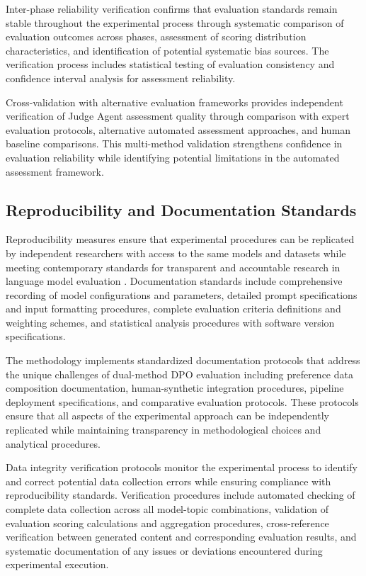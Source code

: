 Inter-phase reliability verification confirms that evaluation standards remain stable throughout the experimental process through systematic comparison of evaluation outcomes across phases, assessment of scoring distribution characteristics, and identification of potential systematic bias sources. The verification process includes statistical testing of evaluation consistency and confidence interval analysis for assessment reliability.

Cross-validation with alternative evaluation frameworks provides independent verification of Judge Agent assessment quality through comparison with expert evaluation protocols, alternative automated assessment approaches, and human baseline comparisons. This multi-method validation strengthens confidence in evaluation reliability while identifying potential limitations in the automated assessment framework.

\subsection{Reproducibility and Documentation Standards}

Reproducibility measures ensure that experimental procedures can be replicated by independent researchers with access to the same models and datasets while meeting contemporary standards for transparent and accountable research in language model evaluation \cite{ma2024reproducibility_query}. Documentation standards include comprehensive recording of model configurations and parameters, detailed prompt specifications and input formatting procedures, complete evaluation criteria definitions and weighting schemes, and statistical analysis procedures with software version specifications.

The methodology implements standardized documentation protocols that address the unique challenges of dual-method DPO evaluation including preference data composition documentation, human-synthetic integration procedures, pipeline deployment specifications, and comparative evaluation protocols. These protocols ensure that all aspects of the experimental approach can be independently replicated while maintaining transparency in methodological choices and analytical procedures.

Data integrity verification protocols monitor the experimental process to identify and correct potential data collection errors while ensuring compliance with reproducibility standards. Verification procedures include automated checking of complete data collection across all model-topic combinations, validation of evaluation scoring calculations and aggregation procedures, cross-reference verification between generated content and corresponding evaluation results, and systematic documentation of any issues or deviations encountered during experimental execution.

